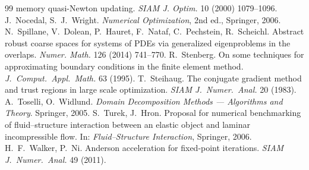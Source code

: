 \documentclass[11pt,a4paper]{article}
\theoremstyle{definition}
\theoremstyle{remark}
\begin{document}
\begin{thebibliography}{99}
memory quasi-Newton updating. \emph{SIAM J. Optim.} 10 (2000) 1079--1096.
 J.~Nocedal, S.~J.~Wright. \emph{Numerical Optimization}, 2nd ed.,
Springer, 2006.
 N.~Spillane, V.~Dolean, P.~Hauret, F.~Nataf, C.~Pechstein,
R.~Scheichl. Abstract robust coarse spaces for systems of PDEs via generalized eigenproblems in the
overlaps. \emph{Numer. Math.} 126 (2014) 741--770.
 R.~Stenberg. On some techniques for approximating boundary conditions in the
finite element method. \emph{J.\ Comput.\ Appl.\ Math.} 63 (1995).
 T.~Steihaug. The conjugate gradient method and trust regions in large scale
optimization. \emph{SIAM J.\ Numer.\ Anal.} 20 (1983).
 A.~Toselli, O.~Widlund. \emph{Domain Decomposition Methods ---
Algorithms and Theory}. Springer, 2005.
 S.~Turek, J.~Hron. Proposal for numerical benchmarking of fluid--structure
interaction between an elastic object and laminar incompressible flow. In: \emph{Fluid--Structure
Interaction}, Springer, 2006.
 H.~F.~Walker, P.~Ni. Anderson acceleration for fixed-point iterations.
\emph{SIAM J.\ Numer.\ Anal.} 49 (2011).
\end{thebibliography}
\end{document}
